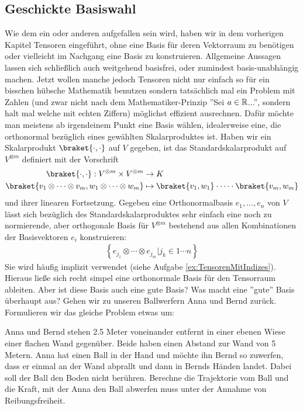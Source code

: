 
\subsection{Geschickte Basiswahl}
Wie dem ein oder anderen aufgefallen sein wird, haben wir in dem vorherigen Kapitel Tensoren eingeführt, ohne eine Basis für deren Vektorraum zu benötigen oder vielleicht im Nachgang eine Basis zu konstruieren. Allgemeine Aussagen lassen sich schließlich auch weitgehend basisfrei, oder zumindest basis-unabhängig machen. 
Jetzt wollen manche jedoch Tensoren nicht nur einfach so für ein bisschen hübsche Mathematik benutzen sondern tatsächlich mal ein Problem mit Zahlen (und zwar nicht nach dem Mathematiker-Prinzip ''Sei $a\in \mathbb{R}$...'', sondern halt mal welche mit echten Ziffern) möglichst effizient ausrechnen. Dafür möchte man meistens ab irgendeinem Punkt eine Basis wählen, idealerweise eine, die orthonormal bezüglich eines gewählten Skalarproduktes ist. Haben wir ein Skalarprodukt $\braket{\cdot,\cdot}$ auf $V$ gegeben, ist das Standardskalarprodukt auf $V^{\otimes m}$ definiert mit der Vorschrift
\begin{align}
	\braket{\cdot, \cdot} : V^{\otimes m} \times V^{\otimes m} &\to K\\
	\braket{v_1 \otimes \cdots \otimes v_m, w_1 \otimes \cdots \otimes w_m} &\mapsto \braket{v_1,w_1} \cdot \cdots \cdot \braket{v_m, w_m}
\end{align}
und ihrer linearen Fortsetzung. Gegeben eine Orthonormalbasis $e_1, ..., e_n$ von $V$ lässt sich bezüglich des Standardskalarproduktes sehr einfach eine noch zu normierende, aber orthogonale Basis für $V^{\otimes m}$ bestehend aus allen Kombinationen der Basisvektoren $e_i$ konstruieren: 
\begin{align}
	\left\{e_{j_1}\otimes \cdots \otimes e_{j_m} | j_k \in {1 \cdots n} \right\}
\end{align}
Sie wird häufig implizit verwendet (siehe Aufgabe \ref{ex:TensorenMitIndizes}). Hieraus ließe sich recht simpel eine orthonormale Basis für den Tensorraum ableiten. Aber ist diese Basis auch eine gute Basis? Was macht eine ''gute'' Basis überhaupt aus?
\medbreak
Gehen wir zu unseren Ballwerfern Anna und Bernd zurück. Formulieren wir das gleiche Problem etwas um:

\begin{gridmp}{\linewidth}
	{\selectfont
	Anna und Bernd stehen 2.5 Meter voneinander entfernt in einer ebenen Wiese einer flachen Wand gegenüber. Beide haben einen Abstand zur Wand von 5 Metern. Anna hat einen Ball in der Hand und möchte ihn Bernd so zuwerfen, dass er einmal an der Wand abprallt und dann in Bernds Händen landet. Dabei soll der Ball den Boden nicht berühren. Berechne die Trajektorie vom Ball und die Kraft, mit der Anna den Ball abwerfen muss unter der Annahme von Reibungsfreiheit.}
	\vspace{8cm}
\end{gridmp}

